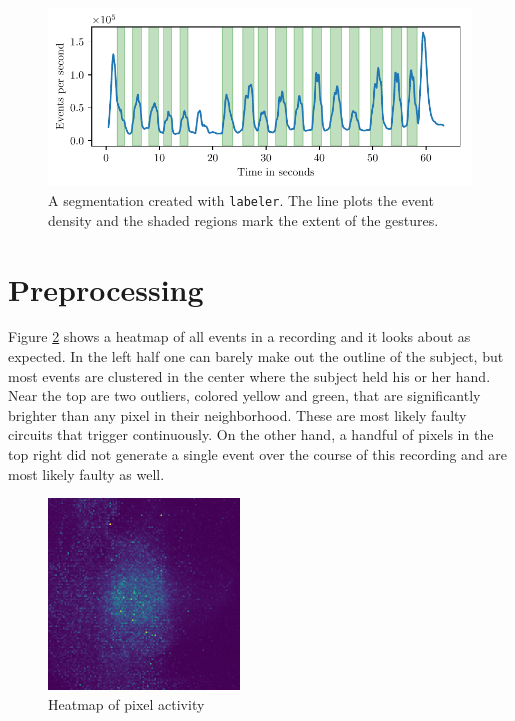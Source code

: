\begin{figure}
  \centering
  \includegraphics{figures/dataset/segmentation}
  \caption{A segmentation created with \texttt{labeler}. The line plots the
    event density and the shaded regions mark the extent of the gestures.}
  \label{fig:segmentation}
\end{figure}

\section{Preprocessing}
\label{sec:preprocessing}

Figure \ref{fig:heatmap} shows a heatmap of all events in a recording and it
looks about as expected. In the left half one can barely make out the outline of
the subject, but most events are clustered in the center where the subject held
his or her hand. Near the top are two outliers, colored yellow and green, that
are significantly brighter than any pixel in their neighborhood. These are most
likely faulty circuits that trigger continuously. On the other hand, a handful
of pixels in the top right did not generate a single event over the course of
this recording and are most likely faulty as well.

\begin{figure}[h]
  \centering
  \includegraphics[width=2in]{figures/dataset/heatmap}
  \caption{Heatmap of pixel activity}
  \label{fig:heatmap}
\end{figure}

